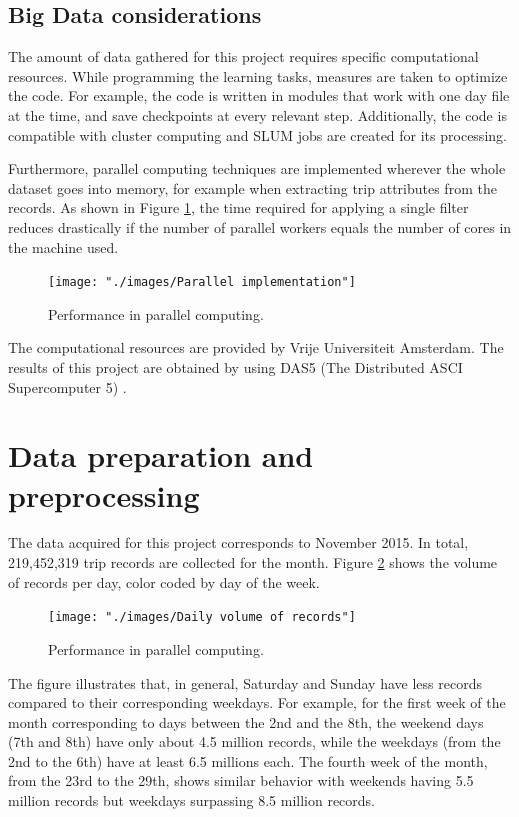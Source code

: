 \documentclass{article}
\begin{document}
\subsection{Big Data considerations}
The amount of data gathered for this project requires specific computational resources. While programming the learning tasks, measures are taken to optimize the code. For example, the code is written in modules that work with one day file at the time, and save checkpoints at every relevant step. Additionally, the code is compatible with cluster computing and SLUM jobs are created for its processing.

Furthermore, parallel computing techniques are implemented wherever the whole dataset goes into memory, for example when extracting trip attributes from the records. As shown in Figure \ref{fig:bigdata/parallel}, the time required for applying a single filter reduces drastically if the number of parallel workers equals the number of cores in the machine used. 

\begin{figure}[H]
  \centering
  \texttt{[image: "./images/Parallel implementation"]}
  \caption{Performance in parallel computing.}
  \label{fig:bigdata/parallel}
\end{figure}

The computational resources are provided by Vrije Universiteit Amsterdam. The results of this project are obtained by using DAS5 (The Distributed ASCI Supercomputer 5) \cite{bal2016medium}. 

\newpage
\section{Data preparation and preprocessing}
\label{sec:partI}
The data acquired for this project corresponds to November 2015. In total, 219,452,319 trip records are collected for the month. Figure \ref{fig:preprocessing/volume} shows the volume of records per day, color coded by day of the week. 

\begin{figure}[H]
  \centering
  \texttt{[image: "./images/Daily volume of records"]}
  \caption{Performance in parallel computing.}
  \label{fig:preprocessing/volume}
\end{figure}

The figure illustrates that, in general, Saturday and Sunday have less records compared to their corresponding weekdays. For example, for the first week of the month corresponding to days between the 2nd and the 8th, the weekend days (7th and 8th) have only about 4.5 million records, while the weekdays (from the 2nd to the 6th) have at least 6.5 millions each. The fourth week of the month, from the 23rd to the 29th, shows similar behavior with weekends having 5.5 million records but weekdays surpassing 8.5 million records.
\end{document}
